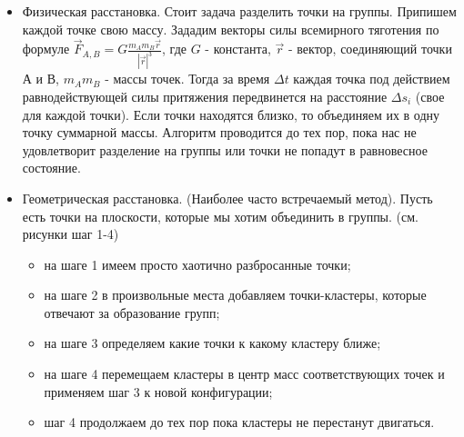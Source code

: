 \begin {itemize}
\begin{figure}[h]
\caption{Функции использующиеся в алгоритме самообучающихся карт}
\label{ris:diff_func}
\end{figure}

\begin{figure}[h!]
\begin{minipage}[h]{0.49\linewidth}
\end{minipage}
\hfill
\begin{minipage}[h]{0.49\linewidth}
\end{minipage}
\end{figure}

\item  Физическая расстановка.
Стоит задача разделить точки на группы. Припишем каждой точке свою массу. Зададим векторы силы всемирного тяготения по формуле 
$\vec{F}_{A,B} = G \frac{m_{A} m_{B}\vec{r}}{|\vec{r}|^3}$, где $G$ - константа, $\vec{r}$ - вектор, соединяющий точки А и В, $m_{A} m_{B}$ - массы точек. Тогда за время $\Delta t$ каждая точка под действием равнодействующей силы притяжения передвинется на расстояние $\Delta s_i$ (свое для каждой точки). Если точки находятся близко, то объединяем их в одну точку суммарной массы. Алгоритм проводится до тех пор, пока нас не удовлетворит разделение на группы или точки не попадут в равновесное состояние.  

\item Геометрическая расстановка. (Наиболее часто встречаемый метод). Пусть есть точки на плоскости, которые мы хотим объединить в группы. (см. рисунки шаг 1-4)
\begin{itemize}
\item на шаге 1 имеем просто хаотично разбросанные точки;
\item на шаге 2 в произвольные места добавляем точки-кластеры, которые отвечают за образование групп;
\item на шаге 3 определяем какие точки к какому кластеру ближе;
\item на шаге 4 перемещаем кластеры в центр масс соответствующих точек и применяем шаг 3 к новой конфигурации;
\item шаг 4 продолжаем до тех пор пока кластеры не перестанут двигаться.
\end{itemize}


\end{itemize}
